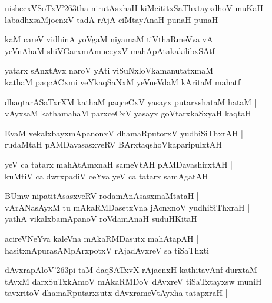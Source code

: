 \documentclass[twoside,12pt,openright]{book}
\def\S{\char'263}
\newcounter{shloka}[chapter]
\begin{document}
\begin{shloka}
nishecxVSoTxV\S tha nirutAsxhaH kiMcititxSaThxtayxdhoV muKaH |\\
labadhxsaMjocnxV tadA rAjA ciMtayAnaH punaH punaH 
\end{shloka}

\begin{shloka}
kaM careV vidhinA yoVgaM niyamaM tiVthaRmeVva vA |\\
yeVnAhaM shiVGarxmAmuceyxV mahApAtakakilibxSAtf 
\end{shloka}

\begin{shloka}
yatarx sAnxtAvx naroV yAti viSuNxloVkamanutatxmaM |\\
kathaM paqcACxmi veYkaqSaNxM yeVneVdaM kAritaM mahatf 
\end{shloka}

\begin{shloka}
dhaqtarASaTxrXM kathaM paqceCxV yasayx putarxshataM hataM |\\
vAyxsaM kathamahaM parxceCxV yasayx goVtarxkaSxyaH kaqtaH 
\end{shloka}

\begin{shloka}
EvaM vekalxbayxmApanonxV dhamaRputorxV yudhiSiThxrAH |\\
rudaMtaH pAMDavasasxveRV BArxtaqshoVkaparipulxtAH
\end{shloka}

\begin{shloka}
yeV ca tatarx mahAtAmxnaH sameVtAH pAMDavashirxtAH |\\
kuMtiV ca dwrxpadiV ceYva yeV ca tatarx samAgatAH 
\end{shloka}

\begin{shloka}
BUmw nipatitAsasxveRV rodamAnAsasxmaMtataH |\\
vArANasAyxM tu mAkaRMDasetxVna jAcnxnoV yudhiSiThxraH |\\
yathA vikalxbamApanoV roVdamAnaH suduHKitaH 
\end{shloka}

\begin{shloka}
acireVNeYva kaleVna mAkaRMDasutx mahAtapAH |\\
hasitxnApurasAMpArxpotxV rAjadAvxreV sa tiSaThxti 
\end{shloka}

\begin{shloka}
dAvxrapAloV\S pi taM daqSATxvX rAjacnxH kathitavAnf durxtaM |\\
tAvxM darxSuTxkAmoV mAkaRMDoV dAvxreV tiSaTxtayxsw muniH \\
tavxritoV dhamaRputarxsutx dAvxrameVtAyxha tatapxraH |
\end{shloka}
\end{document}
